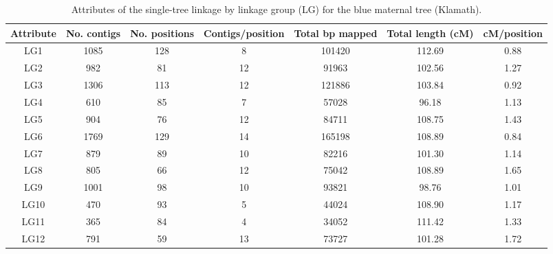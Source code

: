 \documentclass[smallextended]{svjour3}
\begin{document}
\clearpage
\begin{landscape}
\begin{table}[ht]
\caption{Attributes of the single-tree linkage by linkage group (LG) for the blue maternal tree (Klamath).} 
\begin{tabular}{ccccccc}
\toprule
Attribute & No. contigs & No. positions & Contigs/position & Total bp mapped & Total length (cM) & cM/position \\
\midrule
LG1 & 1085 & 128 & 8 & 101420 & 112.69 & 0.88 \\
LG2 & 982 & 81 & 12 & 91963 & 102.56 & 1.27 \\
LG3 & 1306 & 113 & 12 & 121886 & 103.84 & 0.92 \\
LG4 & 610 & 85 & 7 & 57028 & 96.18 & 1.13 \\
LG5 & 904 & 76 & 12 & 84711 & 108.75 & 1.43 \\
LG6 & 1769 & 129 & 14 & 165198 & 108.89 & 0.84 \\
LG7 & 879 & 89 & 10 & 82216 & 101.30 & 1.14 \\
LG8 & 805 & 66 & 12 & 75042 & 108.89 & 1.65 \\
LG9 & 1001 & 98 & 10 & 93821 & 98.76 & 1.01 \\
LG10 & 470 & 93 & 5 & 44024 & 108.90 & 1.17 \\
LG11 & 365 & 84 & 4 & 34052 & 111.42 & 1.33 \\
LG12 & 791 & 59 & 13 & 73727 & 101.28 & 1.72 \\
\bottomrule
\end{tabular}
\label{t:label}
\end{table}
\end{landscape}
\end{document}

